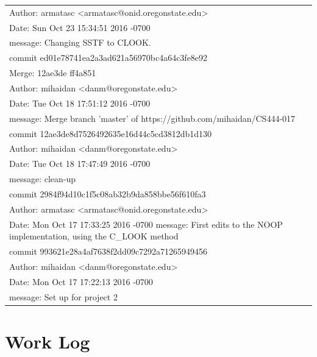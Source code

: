 \documentclass[letterpaper,10pt,onecolumn]{IEEEtran}
\begin{document}
\begin{tabular}{ | p{16.75cm} | }
        Author: armatasc <armatasc@onid.oregonstate.edu> \\
        Date:   Sun Oct 23 15:34:51 2016 -0700 \\
        message: Changing SSTF to CLOOK. \\
        \hline
        commit ed01e78741ea2a3ad621a56970bc4a64c3fe8e92 \\
        Merge: 12ae3de ff4a851 \\
        Author: mihaidan <danm@oregonstate.edu> \\
        Date:   Tue Oct 18 17:51:12 2016 -0700 \\
        message: Merge branch 'master' of https://github.com/mihaidan/CS444-017 \\
        \hline
        commit 12ae3de8d7526492635e16d44c5cd3812db1d130 \\
        Author: mihaidan <danm@oregonstate.edu> \\
        Date:   Tue Oct 18 17:47:49 2016 -0700 \\
        message: clean-up \\
        \hline
        commit 2984f94d10c1f5c08ab32b9da858bbe56f610fa3 \\
        Author: armatasc <armatasc@onid.oregonstate.edu> \\
        Date:   Mon Oct 17 17:33:25 2016 -0700
        message: First edits to the NOOP implementation, using the C\_LOOK method \\
        \hline
        commit 993621e28a4af7638f2dd09c7292a71265949456 \\
        Author: mihaidan <danm@oregonstate.edu> \\
        Date:   Mon Oct 17 17:22:13 2016 -0700 \\
        message: Set up for project 2 \\
        \hline
    \end{tabular}


    
    \vspace{6mm}
    
    
    \section*{Work Log}
    
\end{document}
